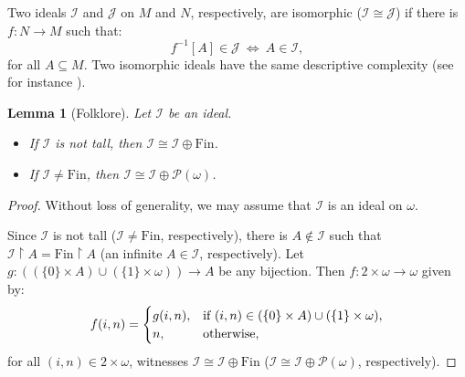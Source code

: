 \documentclass{amsart}
\newcommand{\I}{\mathcal{I}}
\newcommand{\J}{\mathcal{J}}
\newcommand{\Fin}{\mathrm{Fin}}
\newtheorem{lemma}[theorem]{Lemma}
\begin{document}
Two ideals $\I$ and $\J$ on $M$ and $N$, respectively, are isomorphic ($\I\cong\J$) if there is $f:N\to M$ such that:
\[
f^{-1}[A]\in\J\ \Leftrightarrow\ A\in\I,
\]
for all $A\subseteq M$. Two isomorphic ideals have the same descriptive complexity (see for instance \cite[Lemma 7.2]{Debs}). 

\begin{lemma}[Folklore]
\label{lem-isomorphisms}
Let $\I$ be an ideal.
\begin{itemize}
    \item[(a)] If $\I$ is not tall, then $\I\cong\I\oplus\Fin$.
    \item[(b)] If $\I\neq\Fin$, then $\I\cong\I\oplus\mathcal{P}(\omega)$.
\end{itemize}
\end{lemma}

\begin{proof}
Without loss of generality, we may assume that $\I$ is an ideal on $\omega$. 

Since $\I$ is not tall ($\I\neq\Fin$, respectively), there is $A\notin\I$ such that $\I\restriction A=\Fin\restriction A$ (an infinite $A\in\I$, respectively). Let $g:((\{0\}\times A)\cup(\{1\}\times\omega))\to A$ be any bijection. Then $f:2\times\omega\to\omega$ given by:
\[
f(i,n)=\begin{cases}
    g(i,n), & \text{if }(i,n)\in(\{0\}\times A)\cup(\{1\}\times\omega),\cr
    n, & \text{otherwise,}
\end{cases}
\]
for all $(i,n)\in 2\times\omega$, witnesses $\I\cong\I\oplus\Fin$ ($\I\cong\I\oplus\mathcal{P}(\omega)$, respectively).
\end{proof}
\end{document}
